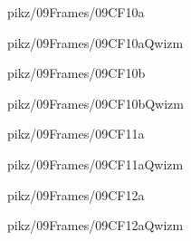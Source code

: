 \documentclass[9pt,xcolor={svgnames, x11names}]{beamer}
\begin{document}

\begin{frame}{pikz/09Frames/09CF10a}
  
\end{frame}


\begin{frame}{pikz/09Frames/09CF10aQwizm}
  
\end{frame}


\begin{frame}{pikz/09Frames/09CF10b}
  
\end{frame}

\begin{frame}{pikz/09Frames/09CF10bQwizm}
  
\end{frame}


\begin{frame}{pikz/09Frames/09CF11a}
  
\end{frame}

\begin{frame}{pikz/09Frames/09CF11aQwizm}
  
\end{frame}


\begin{frame}{pikz/09Frames/09CF12a}
  
\end{frame}


\begin{frame}{pikz/09Frames/09CF12aQwizm}
  
\end{frame}
\end{document}
